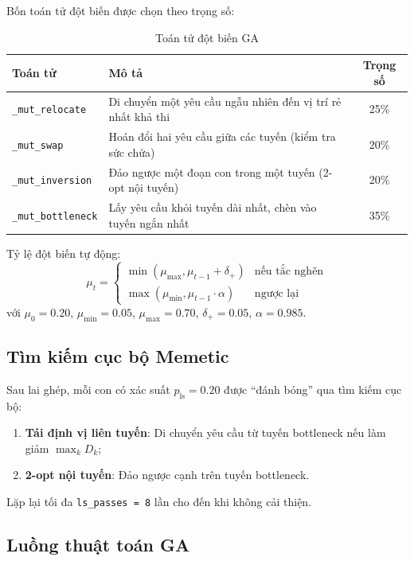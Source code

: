 \documentclass[12pt, a4paper]{article}
\begin{document}
Bốn toán tử đột biến được chọn theo trọng số:

\begin{table}[H]
\centering
\caption{Toán tử đột biến GA}
\begin{tabular}{lp{8cm}c}
\toprule
\textbf{Toán tử} & \textbf{Mô tả} & \textbf{Trọng số} \\
\midrule
\texttt{\_mut\_relocate}    & Di chuyển một yêu cầu ngẫu nhiên đến vị trí rẻ nhất khả thi & 25\% \\
\texttt{\_mut\_swap}        & Hoán đổi hai yêu cầu giữa các tuyến (kiểm tra sức chứa) & 20\% \\
\texttt{\_mut\_inversion}   & Đảo ngược một đoạn con trong một tuyến (2-opt nội tuyến) & 20\% \\
\texttt{\_mut\_bottleneck}  & Lấy yêu cầu khỏi tuyến dài nhất, chèn vào tuyến ngắn nhất & 35\% \\
\bottomrule
\end{tabular}
\end{table}

Tỷ lệ đột biến tự động:
\begin{equation}
  \mu_t = \begin{cases}
    \min(\mu_{\max}, \mu_{t-1} + \delta_+) & \text{nếu tắc nghẽn} \\
    \max(\mu_{\min}, \mu_{t-1} \cdot \alpha) & \text{ngược lại}
  \end{cases}
\end{equation}
với $\mu_0 = 0.20$, $\mu_{\min} = 0.05$, $\mu_{\max} = 0.70$, $\delta_+ = 0.05$, $\alpha = 0.985$.

\subsection{Tìm kiếm cục bộ Memetic}

Sau lai ghép, mỗi con có xác suất $p_{\text{ls}} = 0.20$ được ``đánh bóng'' qua tìm kiếm cục bộ:

\begin{enumerate}[noitemsep]
  \item \textbf{Tái định vị liên tuyến}: Di chuyển yêu cầu từ tuyến bottleneck nếu làm giảm $\max_k D_k$;
  \item \textbf{2-opt nội tuyến}: Đảo ngược cạnh trên tuyến bottleneck.
\end{enumerate}

Lặp lại tối đa \texttt{ls\_passes = 8} lần cho đến khi không cải thiện.

\subsection{Luồng thuật toán GA}
\end{document}
